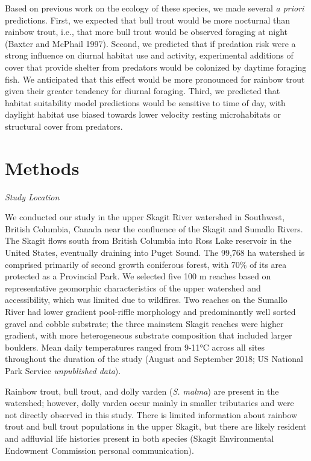\documentclass[]{article}
\begin{document}
Based on previous work on the ecology of these species, we made several
\emph{a priori} predictions. First, we expected that bull trout would be
more nocturnal than rainbow trout, i.e., that more bull trout would be
observed foraging at night (Baxter and McPhail 1997). Second, we
predicted that if predation risk were a strong influence on diurnal
habitat use and activity, experimental additions of cover that provide
shelter from predators would be colonized by daytime foraging fish. We
anticipated that this effect would be more pronounced for rainbow trout
given their greater tendency for diurnal foraging. Third, we predicted
that habitat suitability model predictions would be sensitive to time of
day, with daylight habitat use biased towards lower velocity resting
microhabitats or structural cover from predators.

\section{Methods}\label{methods}

\emph{Study Location}

We conducted our study in the upper Skagit River watershed in Southwest,
British Columbia, Canada near the confluence of the Skagit and Sumallo
Rivers. The Skagit flows south from British Columbia into Ross Lake
reservoir in the United States, eventually draining into Puget Sound.
The 99,768 ha watershed is comprised primarily of second growth
coniferous forest, with 70\% of its area protected as a Provincial Park.
We selected five 100 m reaches based on representative geomorphic
characteristics of the upper watershed and accessibility, which was
limited due to wildfires. Two reaches on the Sumallo River had lower
gradient pool-riffle morphology and predominantly well sorted gravel and
cobble substrate; the three mainstem Skagit reaches were higher
gradient, with more heterogeneous substrate composition that included
larger boulders. Mean daily temperatures ranged from 9-11°C across all
sites throughout the duration of the study (August and September 2018;
US National Park Service \emph{unpublished data}).

Rainbow trout, bull trout, and dolly varden (\emph{S. malma}) are
present in the watershed; however, dolly varden occur mainly in smaller
tributaries and were not directly observed in this study. There is
limited information about rainbow trout and bull trout populations in
the upper Skagit, but there are likely resident and adfluvial life
histories present in both species (Skagit Environmental Endowment
Commission personal communication).
\end{document}
